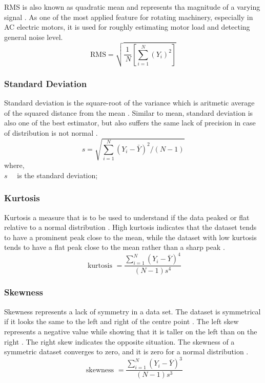 RMS is also known as quadratic mean and represents tha magnitude of a varying signal \cite{sait2011review,shukla2015analysis}. As one of the most applied feature for rotating machinery, especially in AC electric motors, it is used for roughly estimating motor load and detecting general noise level.
\begin{equation}
\text{RMS}=\sqrt{\frac{1}{{~N}}\left[\sum_{{i}=1}^{{N}}\left({Y}_{{i}}\right)^{2}\right]}	
\label{RMS}
\end{equation}
\subsubsection{Standard Deviation}

Standard deviation is the square-root of the variance which is aritmetic average of the squared distance from the mean \cite{shukla2015analysis}. Similar to mean, standard deviation is also one of the best estimator, but also suffers the same lack of precision in case of distribution is not normal \cite{croarkin2012handbook}.
\begin{equation}
s=\sqrt{\sum_{i=1}^{N}\left(Y_{i}-\bar{Y}\right)^{2} /(N-1)}
\label{std}
\end{equation}
where,\\
$s \quad$ is the standard deviation;\\
\subsubsection{Kurtosis} 

Kurtosis a measure that is to be used to understand if the data peaked or flat relative to a normal distribution \cite{shukla2015analysis}. High kurtosis indicates that the dataset tends to have a prominent peak close to the mean, while the dataset with low kurtosis tends to have a flat peak close to the mean rather than a sharp peak \cite{croarkin2012handbook}.
\begin{equation}
\text { kurtosis }=\frac{\sum_{i=1}^{N}\left(Y_{i}-\bar{Y}\right)^{4}}{(N-1) s^{4}}
\label{kurtosis}
\end{equation}
\subsubsection{Skewness} 

Skewness represents a lack of symmetry in a data set. The dataset is symmetrical if it looks the same to the left and right of the centre point \cite{shukla2015analysis}. The left skew represents a negative value while showing that it is taller on the left than on the right \cite{croarkin2012handbook}. The right skew indicates the opposite situation. The skewness of a symmetric dataset converges to zero, and it is zero for a normal distribution \cite{croarkin2012handbook}.
\begin{equation}
\text { skewness }=\frac{\sum_{i=1}^{N}\left(Y_{i}-\bar{Y}\right)^{3}}{(N-1) s^{3}}
\label{skewness}
\end{equation}
